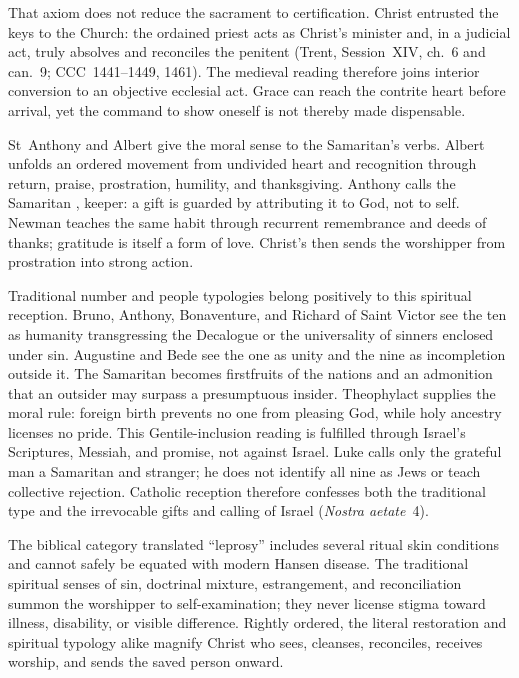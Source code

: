 That axiom does not reduce the sacrament to certification. Christ entrusted
the keys to the Church: the ordained priest acts as Christ's minister and,
in a judicial act, truly absolves and reconciles the penitent
(Trent, Session~XIV, ch.~6 and can.~9; CCC~1441--1449, 1461). The medieval
reading therefore joins interior conversion to an objective ecclesial act.
Grace can reach the contrite heart before arrival, yet the command to show
oneself is not thereby made dispensable.

St~Anthony and Albert give the moral sense to the Samaritan's verbs. Albert
unfolds an ordered movement from undivided heart and recognition through
return, praise, prostration, humility, and thanksgiving. Anthony calls the
Samaritan , keeper: a gift is guarded by attributing it to God,
not to self. Newman teaches the same habit through recurrent remembrance and
deeds of thanks; gratitude is itself a form of love. Christ's  then sends the worshipper from prostration into strong action.

Traditional number and people typologies belong positively to this spiritual
reception. Bruno, Anthony, Bonaventure, and Richard of Saint Victor see the
ten as humanity transgressing the Decalogue or the universality of sinners
enclosed under sin. Augustine and Bede see the one as unity and the nine as
incompletion outside it. The Samaritan becomes firstfruits of the nations and
an admonition that an outsider may surpass a presumptuous insider.
Theophylact supplies the moral rule: foreign birth prevents no one from
pleasing God, while holy ancestry licenses no pride. This Gentile-inclusion
reading is fulfilled through Israel's Scriptures, Messiah, and promise, not
against Israel. Luke calls only the grateful man a Samaritan and stranger; he
does not identify all nine as Jews or teach collective rejection. Catholic
reception therefore confesses both the traditional type and the irrevocable
gifts and calling of Israel (\emph{Nostra aetate}~4).

The biblical category translated ``leprosy'' includes several ritual skin
conditions and cannot safely be equated with modern Hansen disease. The
traditional spiritual senses of sin, doctrinal mixture, estrangement, and
reconciliation summon the worshipper to self-examination; they never license
stigma toward illness, disability, or visible difference. Rightly ordered, the
literal restoration and spiritual typology alike magnify Christ who sees,
cleanses, reconciles, receives worship, and sends the saved person onward.

